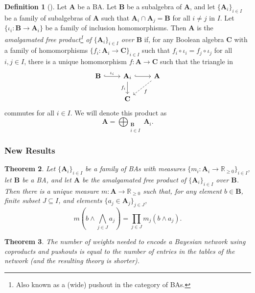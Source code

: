 \documentclass{article}
\newtheorem{theorem}{Theorem}
\theoremstyle{definition}
\newtheorem{definition}[theorem]{Definition}
\theoremstyle{remark}
\begin{document}
\begin{definition}[\cite{koppelberg1989handbook}]
  Let $\mathbf{A}$ be a BA. Let $\mathbf{B}$ be a subalgebra of $\mathbf{A}$,
  and let $\{ \mathbf{A}_i\}_{i \in I}$ be a family of subalgebras of $\mathbf{A}$
  such that $\mathbf{A}_i \cap \mathbf{A}_j = \mathbf{B}$ for all $i \ne j$ in
  $I$. Let $\{ \iota_i \colon \mathbf{B} \to \mathbf{A}_i \}$ be a family of
  inclusion homomorphisms. Then $\mathbf{A}$ is the \emph{amalgamated free
    product\footnote{Also known as a (wide) pushout in the category of BAs.} of
    $\{\mathbf{A}_{i} \}_{i \in I}$ over $\mathbf{B}$} if, for any Boolean
  algebra $\mathbf{C}$ with a family of homomorphisms $\{ f_i\colon \mathbf{A}_i
  \to \mathbf{C} \}_{i \in I}$ such that $f_i \circ \iota_i = f_j \circ \iota_j$
  for all $i, j \in I$, there is a unique homomorphism $f\colon \mathbf{A} \to
  \mathbf{C}$ such that the triangle in
  \[
    \begin{tikzcd}
      \mathbf{B} \ar[r,hookrightarrow,"\iota_i"] & \mathbf{A}_i
      \ar[r,hookrightarrow] \ar[d,swap,"f_i"] & \mathbf{A} \ar[ld,dashed,"f"] \\
      & \mathbf{C}
    \end{tikzcd}
  \]
  commutes for all $i \in I$. We will denote this product as
  \[
    \mathbf{A} = \bigoplus_{\substack{\mathbf{B}\\ i \in I}} \mathbf{A}_i.
  \]
\end{definition}

\subsubsection{New Results}

\begin{theorem}
  Let $\{ \mathbf{A}_i \}_{i \in I}$ be a family of BAs with measures $\{
  m_i\colon \mathbf{A}_i \to \mathbb{R}_{\ge 0} \}_{i \in I}$, let $\mathbf{B}$
  be a BA, and let $\mathbf{A}$ be the amalgamated free product of $\{
  \mathbf{A}_i \}_{i \in I}$ over $\mathbf{B}$. Then there is a unique measure
  $m\colon \mathbf{A} \to \mathbb{R}_{\ge 0}$ such that, for any element $b \in
  \mathbf{B}$, finite subset $J \subseteq I$, and elements $\{ a_j \in
  \mathbf{A}_j \}_{j \in J}$,
  \[
    m \left(b \land \bigwedge_{j \in J} a_j \right) = \prod_{j \in J} m_j(b
    \land a_j).
  \]
\end{theorem}

\begin{theorem}
  The number of weights needed to encode a Bayesian network using
  coproducts and pushouts is equal to the number of entries in the tables of the
  network (and the resulting theory is shorter).
\end{theorem}
\end{document}
